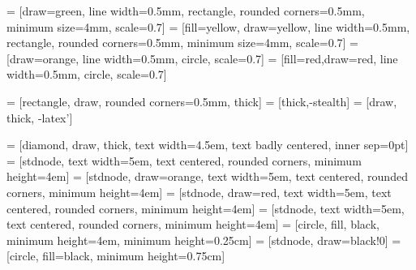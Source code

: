 
   = [draw=green, line width=0.5mm, rectangle, rounded corners=0.5mm,
                            minimum size=4mm, scale=0.7]
  = [fill=yellow, draw=yellow, line width=0.5mm, rectangle,
                            rounded corners=0.5mm, minimum size=4mm, scale=0.7]
  = [draw=orange, line width=0.5mm, circle, scale=0.7]
 = [fill=red,draw=red, line width=0.5mm, circle, scale=0.7]

      = [rectangle, draw, rounded corners=0.5mm, thick]
        = [thick,-stealth]
         = [draw, thick, -latex']

        = [diamond, draw, thick, text width=4.5em, text badly centered, inner sep=0pt]
           = [stdnode, text width=5em, text centered, rounded corners, minimum height=4em]
  = [stdnode, draw=orange, text width=5em, text centered, rounded corners, minimum height=4em]
 = [stdnode, draw=red, text width=5em, text centered, rounded corners, minimum height=4em]
           = [stdnode, text width=5em, text centered, rounded corners, minimum height=4em]
   = [circle, fill, black, minimum height=4em, minimum height=0.25cm]
          = [stdnode, draw=black!0]
            = [circle, fill=black, minimum height=0.75cm]

